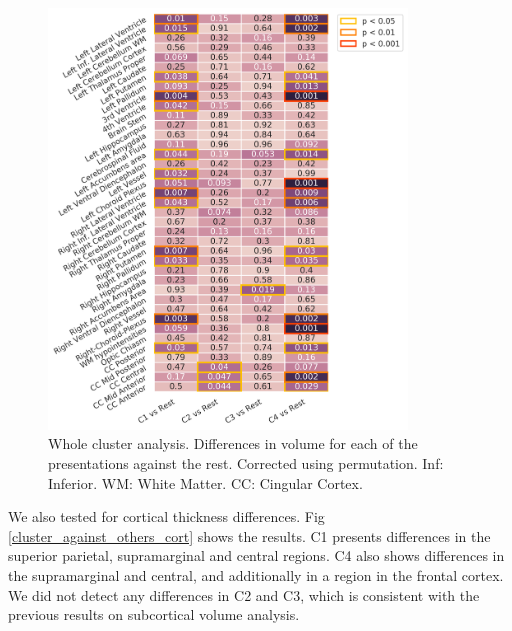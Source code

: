\begin{figure}[!htbp]
\centering
\includegraphics[width=0.85\textwidth]{figures/cimlr/clusteragainstothers.png}
\caption[Whole cluster analysis.]{Whole cluster analysis. Differences in volume for each of the presentations against the rest. Corrected using permutation. Inf: Inferior. WM: White Matter. CC: Cingular Cortex.}
\label{cluster_against_others}
\end{figure}

We also tested for cortical thickness differences. Fig \ref{cluster_against_others_cort} shows the results. C1 presents differences in the superior parietal, supramarginal and central regions. C4 also shows differences in the supramarginal and central, and additionally in a region in the frontal cortex. We did not detect any differences in C2 and C3, which is consistent with the previous results on subcortical volume analysis. \\

